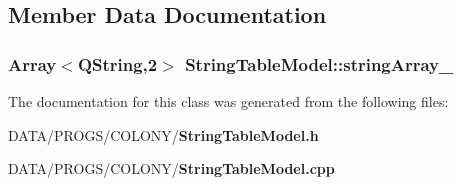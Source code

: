 \subsection{Member Data Documentation}
\subsubsection{\setlength{\rightskip}{0pt plus 5cm}Array$<$QString,2$>$ {\bf StringTableModel::stringArray\_\-}\hspace{0.3cm}{\tt  [private]}}\label{classStringTableModel_a89b597310c2eadef3c631757f1ba546}




The documentation for this class was generated from the following files:\begin{CompactItemize}
\item 
DATA/PROGS/COLONY/{\bf StringTableModel.h}\item 
DATA/PROGS/COLONY/{\bf StringTableModel.cpp}\end{CompactItemize}
